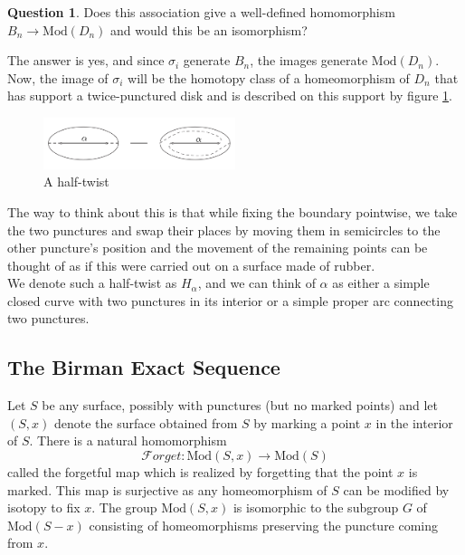 \documentclass[reqno]{amsart}
\theoremstyle{definition}
\newtheorem{question}[theorem]{Question}
\theoremstyle{remark}
\newcommand{\Mod}{{\mathrm{Mod}}}
\newcommand{\Forget}{{\mathcal{F}}orget}
\begin{document}
\begin{question}\label{question-1}
    Does this association give a well-defined homomorphism
    $B_n \to \Mod(D_n) $ and would this be an isomorphism?
\end{question}

The answer is yes, and since $\sigma_i$ generate
$B_n$, the images generate $\Mod(D_n)$. Now, the
image of $\sigma_i$ will be the
homotopy class of a homeomorphism
of $D_n$ that has support a twice-punctured disk and is
described on this support by figure \ref{fig:half-twist-png}.

\begin{figure}[htpb]
    \centering
    \includegraphics[width=0.5\textwidth]{half-twist.png}
    \caption{A half-twist}
    \label{fig:half-twist-png}
\end{figure}

The way to think about this is that while fixing the boundary
pointwise, we take the two punctures and swap their places
by moving them in semicircles to the other puncture's position and
the movement of the remaining points can be
thought of as if this were carried out on
a surface made of rubber.\\


We denote such a half-twist as $H_{\alpha}$, and we
can think of $\alpha$ as either a simple closed
curve with two punctures in its interior or a simple
proper arc connecting two punctures.


\subsection{The Birman Exact Sequence}

Let $S$ be any surface, possibly with punctures (but no 
marked points) and let
$\left( S, x \right) $ denote the surface obtained
from $S$ by marking a point $x$ in the
interior of $S$. There is a natural
homomorphism
\[
\Forget \colon \Mod \left( S, x \right) \to \Mod(S)
\] 
called the forgetful map which is realized by forgetting
that the point $x$ is marked. This map is
surjective as any homeomorphism of $S$ can
be modified by isotopy to fix $x$. The
group $\Mod(S,x)$ is isomorphic to the
subgroup $G$ of $\Mod \left( S - x \right) $ 
consisting of homeomorphisms preserving the
puncture coming from $x$.
\end{document}
